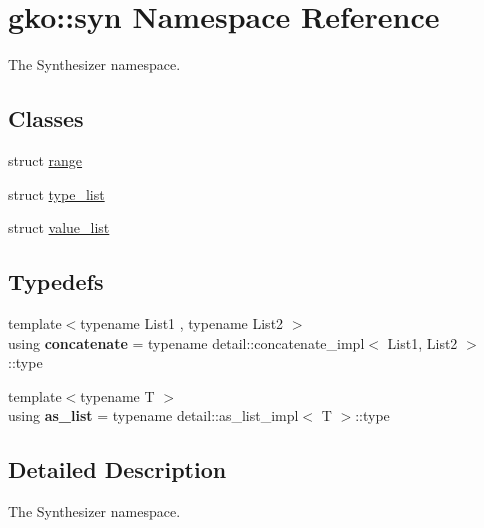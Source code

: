 \hypertarget{namespacegko_1_1syn}{}\section{gko\+:\+:syn Namespace Reference}
\label{namespacegko_1_1syn}


The Synthesizer namespace.  


\subsection*{Classes}
\begin{DoxyCompactItemize}
\item 
struct \hyperlink{structgko_1_1syn_1_1range}{range}
\item 
struct \hyperlink{structgko_1_1syn_1_1type__list}{type\+\_\+list}
\item 
struct \hyperlink{structgko_1_1syn_1_1value__list}{value\+\_\+list}
\end{DoxyCompactItemize}
\subsection*{Typedefs}
\begin{DoxyCompactItemize}
\item 
\mbox{\label{namespacegko_1_1syn_a2a428ac3d9404c3216521b1378f0dffd}} 
{\footnotesize template$<$typename List1 , typename List2 $>$ }\\using {\bfseries concatenate} = typename detail\+::concatenate\+\_\+impl$<$ List1, List2 $>$\+::type
\item 
\mbox{\label{namespacegko_1_1syn_aee837cdba7817c4f016cbb2a837053b8}} 
{\footnotesize template$<$typename T $>$ }\\using {\bfseries as\+\_\+list} = typename detail\+::as\+\_\+list\+\_\+impl$<$ T $>$\+::type
\end{DoxyCompactItemize}


\subsection{Detailed Description}
The Synthesizer namespace. 